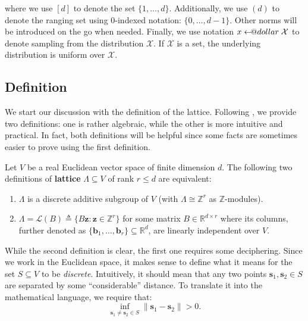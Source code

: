 \documentclass{template}
\makeatletter
\newcommand\leftarrowS{\leftarrow\joinrel\smalldollar}
\newcommand{\smalldollar}{\mathrel{\mathpalette\small@dollar\relax}}
\newcommand{\small@dollar}[2]{%
  \vcenter{\hbox{%
    $#1\textnormal{\fontsize{0.7\dimexpr\f@size pt}{0}\selectfont\$}$%
  }}%
}
\makeatother
\begin{document}
where we use $[d]$ to denote the set $\{1,\dots,d\}$. Additionally, we use $(d)$
to denote the ranging set using 0-indexed notation: $\{0,\dots,d-1\}$. Other
norms will be introduced on the go when needed. Finally, we use notation $x
\leftarrowS \mathcal{X}$ to denote sampling from the distribution $\mathcal{X}$.
If $\mathcal{X}$ is a set, the underlying distribution is uniform over
$\mathcal{X}$. 

\subsection{Definition}

We start our discussion with the definition of the lattice. Following
\cite{nist}, we provide two definitions: one is rather algebraic, while the
other is more intuitive and practical. In fact, both definitions will be helpful
since some facts are sometimes easier to prove using the first definition. 
\begin{definition}\label{def:lattice}
    Let $V$ be a real Euclidean vector space of finite dimension $d$. The
    following two definitions of \textbf{lattice} $\Lambda \subseteq V$ of rank
    $r \leq d$ are equivalent:
    \begin{enumerate}
        \item[\textit{(i)}] $\Lambda$ is a discrete additive subgroup of $V$
        (with $\Lambda \cong \mathbb{Z}^r$ as $\mathbb{Z}$-modules).
        \item[\textit{(ii)}] $\Lambda = \mathcal{L}(B) \triangleq \{B\mathbf{z}:
        \mathbf{z} \in \mathbb{Z}^r\}$ for some matrix $B \in \mathbb{R}^{d
        \times r}$ where its columns, further denoted as
        $\{\mathbf{b}_1,\dots,\mathbf{b}_r\} \subseteq \mathbb{R}^d$, are
        linearly independent over $V$. 
    \end{enumerate}
\end{definition}

While the second definition is clear, the first one requires some deciphering.
Since we work in the Euclidean space, it makes sense to define what it means for
the set $S \subseteq V$ to be \textit{discrete}. Intuitively, it should mean
that any two points $\mathbf{s}_1,\mathbf{s}_2 \in S$ are separated by some
``considerable'' distance. To translate it into the mathematical language, we
require that:
\begin{equation*}
    \inf_{\mathbf{s}_1 \neq \mathbf{s}_2 \in S} \|\mathbf{s}_1-\mathbf{s}_2\| > 0.
\end{equation*}
\end{document}
